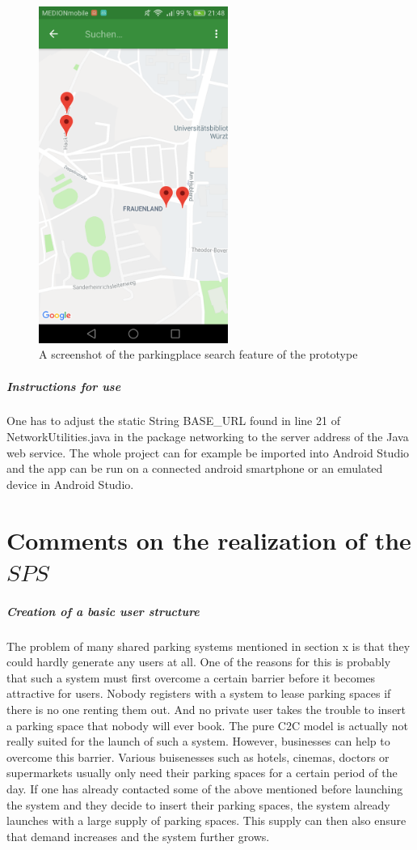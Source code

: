\begin{figure}
	\centering
	\includegraphics[height=11cm]{logos/screenshot-search.png}
	\caption{A screenshot of the parkingplace search feature of the prototype}
	\label{img:screenshot-search}
\end{figure}

\subparagraph{Instructions for use}
One has to adjust the static String BASE\_URL found in line 21 of NetworkUtilities.java in the package networking to the server address of the Java web service. The whole project can for example be imported into Android Studio and the app can be run on a connected android smartphone or an emulated device in Android Studio.

\section{Comments on the realization of the $SPS$}\label{sec:Comments on the realization}

\subparagraph{Creation of a basic user structure}
The problem of many shared parking systems mentioned in section x is that they could hardly generate any users at all. One of the reasons for this is probably that such a system must first overcome a certain barrier before it becomes attractive for users. Nobody registers with a system to lease parking spaces if there is no one renting them out. And no private user takes the trouble to insert a parking space that nobody will ever book. The pure C2C model is actually not really suited for the launch of such a system. However, businesses can help to overcome this barrier. Various buisenesses such as hotels, cinemas, doctors or supermarkets usually only need their parking spaces for a certain period of the day. If one has already contacted some of the above mentioned before launching the system and they decide to insert their parking spaces, the system already launches with a large supply of parking spaces. This supply can then also ensure that demand increases and the system further grows.

